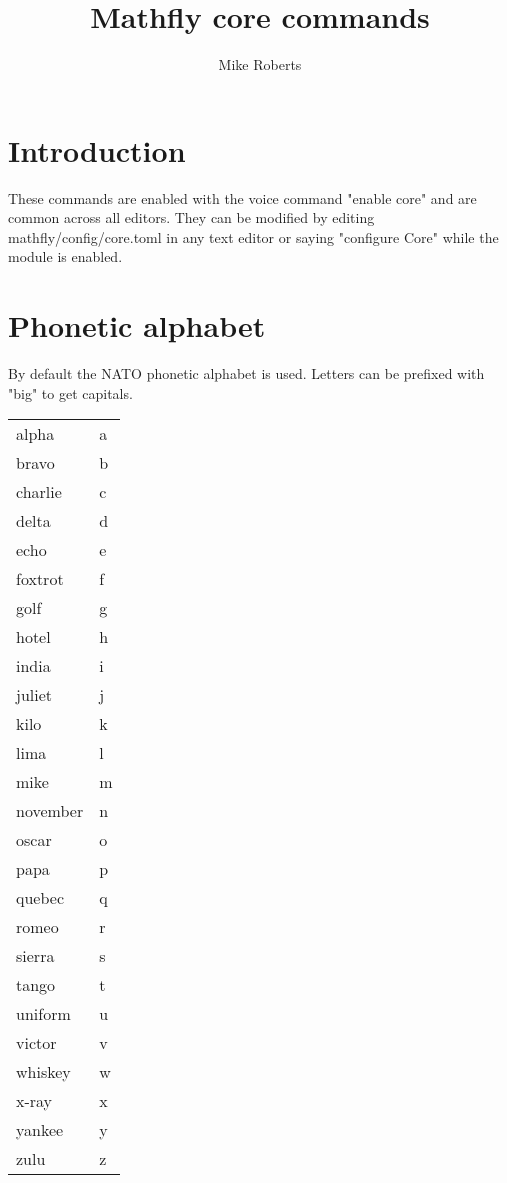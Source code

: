 \documentclass[12pt]{article}
\title{Mathfly core commands}
\author{Mike Roberts}
\begin{document}
\maketitle
\tableofcontents
\section{Introduction}
These commands are enabled with the voice command "enable core" and are common across all editors. They can be modified by editing mathfly/config/core.toml in any text editor or saying "configure Core" while the module is enabled.

\section{Phonetic alphabet}
By default the NATO phonetic alphabet is used. Letters can be prefixed with "big" to get capitals.

\begin{longtable}{ l l}
\noindent
alpha & a \\
bravo & b \\
charlie & c \\
delta & d \\
echo & e \\
foxtrot & f \\
golf & g \\
hotel & h \\
india & i \\
juliet & j \\
kilo & k \\
lima & l \\
mike & m \\
november & n \\
oscar & o \\
papa & p \\
quebec & q \\
romeo & r \\
sierra & s \\
tango & t \\
uniform & u \\
victor & v \\
whiskey & w \\
x-ray & x \\
yankee & y \\
zulu & z \\
\end{longtable}
\end{document}

